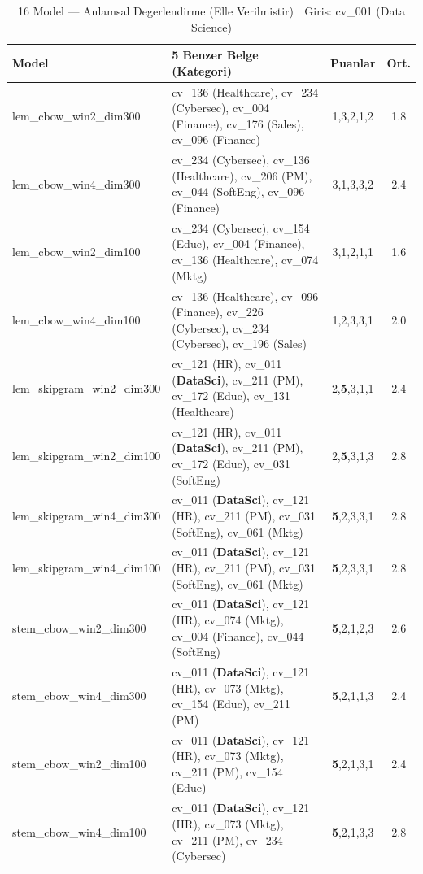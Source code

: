\documentclass[12pt, a4paper]{article}
\begin{document}
\begin{table}[H]
\centering
\caption{16 Model --- Anlamsal Degerlendirme (Elle Verilmistir) | Giris: cv\_001 (Data Science)}
\footnotesize
\begin{tabularx}{\textwidth}{l X c c}
\toprule
\textbf{Model} & \textbf{5 Benzer Belge (Kategori)} & \textbf{Puanlar} & \textbf{Ort.} \\
\midrule
lem\_cbow\_win2\_dim300 & cv\_136 (Healthcare), cv\_234 (Cybersec), cv\_004 (Finance), cv\_176 (Sales), cv\_096 (Finance) & 1,3,2,1,2 & 1.8 \\
lem\_cbow\_win4\_dim300 & cv\_234 (Cybersec), cv\_136 (Healthcare), cv\_206 (PM), cv\_044 (SoftEng), cv\_096 (Finance) & 3,1,3,3,2 & 2.4 \\
lem\_cbow\_win2\_dim100 & cv\_234 (Cybersec), cv\_154 (Educ), cv\_004 (Finance), cv\_136 (Healthcare), cv\_074 (Mktg) & 3,1,2,1,1 & 1.6 \\
lem\_cbow\_win4\_dim100 & cv\_136 (Healthcare), cv\_096 (Finance), cv\_226 (Cybersec), cv\_234 (Cybersec), cv\_196 (Sales) & 1,2,3,3,1 & 2.0 \\
lem\_skipgram\_win2\_dim300 & cv\_121 (HR), cv\_011 (\textbf{DataSci}), cv\_211 (PM), cv\_172 (Educ), cv\_131 (Healthcare) & 2,\textbf{5},3,1,1 & 2.4 \\
lem\_skipgram\_win2\_dim100 & cv\_121 (HR), cv\_011 (\textbf{DataSci}), cv\_211 (PM), cv\_172 (Educ), cv\_031 (SoftEng) & 2,\textbf{5},3,1,3 & 2.8 \\
lem\_skipgram\_win4\_dim300 & cv\_011 (\textbf{DataSci}), cv\_121 (HR), cv\_211 (PM), cv\_031 (SoftEng), cv\_061 (Mktg) & \textbf{5},2,3,3,1 & 2.8 \\
lem\_skipgram\_win4\_dim100 & cv\_011 (\textbf{DataSci}), cv\_121 (HR), cv\_211 (PM), cv\_031 (SoftEng), cv\_061 (Mktg) & \textbf{5},2,3,3,1 & 2.8 \\
stem\_cbow\_win2\_dim300 & cv\_011 (\textbf{DataSci}), cv\_121 (HR), cv\_074 (Mktg), cv\_004 (Finance), cv\_044 (SoftEng) & \textbf{5},2,1,2,3 & 2.6 \\
stem\_cbow\_win4\_dim300 & cv\_011 (\textbf{DataSci}), cv\_121 (HR), cv\_073 (Mktg), cv\_154 (Educ), cv\_211 (PM) & \textbf{5},2,1,1,3 & 2.4 \\
stem\_cbow\_win2\_dim100 & cv\_011 (\textbf{DataSci}), cv\_121 (HR), cv\_073 (Mktg), cv\_211 (PM), cv\_154 (Educ) & \textbf{5},2,1,3,1 & 2.4 \\
stem\_cbow\_win4\_dim100 & cv\_011 (\textbf{DataSci}), cv\_121 (HR), cv\_073 (Mktg), cv\_211 (PM), cv\_234 (Cybersec) & \textbf{5},2,1,3,3 & 2.8 \\

\end{tabularx}
\end{table}
\end{document}
